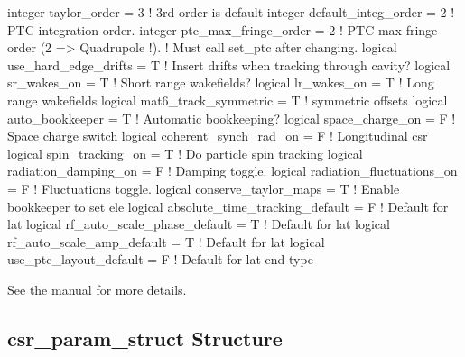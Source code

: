 {{{{{{{\begin{example}
    integer taylor_order = 3               ! 3rd order is default
    integer default_integ_order = 2        ! PTC integration order.
    integer ptc_max_fringe_order = 2       ! PTC max fringe order (2 => Quadrupole !).
                                           !   Must call set_ptc after changing.
    logical use_hard_edge_drifts = T       ! Insert drifts when tracking through cavity?
    logical sr_wakes_on = T                ! Short range wakefields?
    logical lr_wakes_on = T                ! Long range wakefields
    logical mat6_track_symmetric = T       ! symmetric offsets
    logical auto_bookkeeper = T            ! Automatic bookkeeping?
    logical space_charge_on = F            ! Space charge switch
    logical coherent_synch_rad_on = F      ! Longitudinal csr 
    logical spin_tracking_on = T           ! Do particle spin tracking
    logical radiation_damping_on = F       ! Damping toggle.
    logical radiation_fluctuations_on = F  ! Fluctuations toggle.
    logical conserve_taylor_maps = T       ! Enable bookkeeper to set ele%
    logical absolute_time_tracking_default = F  ! Default for lat%
    logical rf_auto_scale_phase_default = T     ! Default for lat%
    logical rf_auto_scale_amp_default = T       ! Default for lat%
    logical use_ptc_layout_default = F          ! Default for lat%
  end type
\end{example}
See the \bmad manual for more details.

\subsection{csr\_param\_struct Structure}
\label{s:csr.param.struct} 

}}}}}}}
